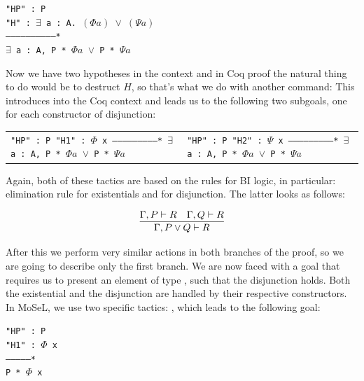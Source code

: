 \begin{minipage}[t]{\linewidth}
\texttt{"HP" : P\\
"H" : \(\exists\) a : A. \((\Phi a)\) \(\vee\) \((\Psi a)\)\\
------------------------------*\\
\(\exists\) a : A, P * \(\Phi a\) \(\vee\) P * \(\Psi a\)}
\end{minipage}

Now we have two hypotheses in the context and in Coq proof the natural thing to do would be to destruct \(H\), so that's what we do with another command: 
This introduces  into the Coq context and leads us to the following two subgoals, one for each constructor of disjunction:

\begin{minipage}[t]{\linewidth}
\begin{tabular}{l l}
  \parbox[t]{0.5\textwidth}{\texttt{"HP" : P\\
  "H1" : $\Phi$ x\\
  --------------------------*\\
  \(\exists\) a : A, P * \(\Phi a\) \(\vee\) P * \(\Psi a\)}} &
  \parbox[t]{0.5\textwidth}{\texttt{"HP" : P\\
  "H2" : $\Psi$ x\\
  --------------------------*\\
  \(\exists\) a : A, P * \(\Phi a\) \(\vee\) P * \(\Psi a\)}}
\end{tabular}
\end{minipage}

Again, both of these tactics are based on the rules for BI logic, in particular: elimination rule for existentials and for disjunction.
The latter looks as follows:

\[\infer{\Gamma, P \vee Q \vdash R}
        {\Gamma, P \vdash R &
         \Gamma, Q \vdash R }\]

After this we perform very similar actions in both branches of the proof, so we are going to describe only the first branch.
We are now faced with a goal that requires us to present an element of type , such that the disjunction holds.
Both the existential and the disjunction are handled by their respective constructors.
In MoSeL, we use two specific tactics: , which leads to the following goal:

\begin{minipage}[t]{\linewidth}
\texttt{"HP" : P\\
"H1" : $\Phi$ x\\
--------------*\\
P * $\Phi$ x}
\end{minipage}


